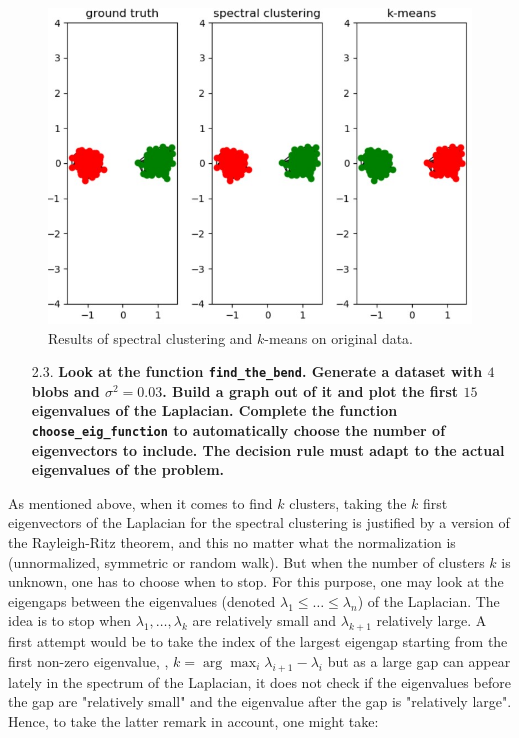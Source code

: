 \documentclass[a4paper, 11pt]{report}
\begin{document}
    \begin{figure}[!h]
        \centering
        \includegraphics[scale=0.6]{images/question_22_results.jpg}
        \caption{Results of spectral clustering and $k$-means on original data.}
        \label{fig:question-22-results}
    \end{figure}

    \pagebreak

\begin{itemize}
    \item[2.3.] \textbf{Look at the function \texttt{find\_the\_bend}. Generate a dataset with $4$ blobs and $\sigma^{2} = 0.03$. Build a graph out of it and plot the first $15$ eigenvalues of the Laplacian. Complete the function \texttt{choose\_eig\_function} to automatically choose the number of eigenvectors to include. The decision rule must adapt to the actual eigenvalues of the problem.}
\end{itemize}

    As mentioned above, when it comes to find $k$ clusters, taking the $k$ first eigenvectors of the Laplacian for the spectral clustering is justified by a version of the Rayleigh-Ritz theorem, and this no matter what the normalization is (unnormalized, symmetric or random walk). But when the number of clusters $k$ is unknown, one has to choose when to stop. For this purpose, one may look at the eigengaps between the eigenvalues (denoted $\lambda_{1} \leq \dots \leq \lambda_{n}$) of the Laplacian. The idea is to stop when $\lambda_{1}, \dots, \lambda_{k}$ are relatively small and $\lambda_{k+1}$ relatively large. A first attempt would be to take the index of the largest eigengap starting from the first non-zero eigenvalue, \ie, $k = \arg \max_{i} \lambda_{i+1} - \lambda_{i}$ but as a large gap can appear lately in the spectrum of the Laplacian, it does not check if the eigenvalues before the gap are "relatively small" and the eigenvalue after the gap is "relatively large". Hence, to take the latter remark in account, one might take:
    
\end{document}
